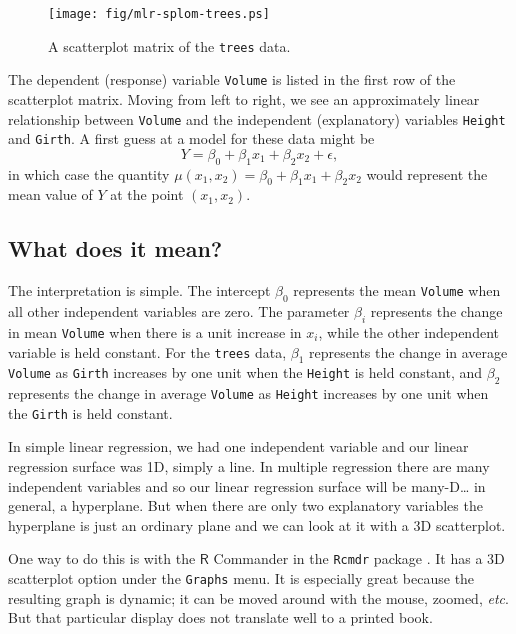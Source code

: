 \begin{figure}[ht!]
\centering
\texttt{[image: fig/mlr-splom-trees.ps]}
\caption[Scatterplot matrix of \texttt{trees} data]{\label{fig-splom-trees}\small A scatterplot matrix of the \texttt{trees} data.}
\end{figure}

The dependent (response) variable \texttt{Volume} is listed in the first row
of the scatterplot matrix. Moving from left to right, we see an
approximately linear relationship between \texttt{Volume} and the independent
(explanatory) variables \texttt{Height} and \texttt{Girth}. A first guess at a model
for these data might be
\begin{equation}
Y=\beta_{0}+\beta_{1}x_{1}+\beta_{2}x_{2}+\epsilon,
\end{equation}
in which case the quantity
\(\mu(x_{1},x_{2})=\beta_{0}+\beta_{1}x_{1}+\beta_{2}x_{2}\) would
represent the mean value of \(Y\) at the point \((x_{1},x_{2})\).

\subsection{What does it mean?}
\label{sec-12-1-1}

The interpretation is simple. The intercept \(\beta_{0}\) represents
the mean \texttt{Volume} when all other independent variables are zero. The
parameter \(\beta_{i}\) represents the change in mean \texttt{Volume} when
there is a unit increase in \(x_{i}\), while the other independent
variable is held constant. For the \texttt{trees} data, \(\beta_{1}\)
represents the change in average \texttt{Volume} as \texttt{Girth} increases by one
unit when the \texttt{Height} is held constant, and \(\beta_{2}\) represents
the change in average \texttt{Volume} as \texttt{Height} increases by one unit when
the \texttt{Girth} is held constant.


In simple linear regression, we had one independent variable and our
linear regression surface was 1D, simply a line. In multiple
regression there are many independent variables and so our linear
regression surface will be many-D\ldots{} in general, a hyperplane. But
when there are only two explanatory variables the hyperplane is just
an ordinary plane and we can look at it with a 3D scatterplot.

One way to do this is with the \(\mathsf{R}\) Commander in the \texttt{Rcmdr}
package \cite{Rcmdr}. It has a 3D scatterplot option under the
\texttt{Graphs} menu. It is especially great because the resulting graph is
dynamic; it can be moved around with the mouse, zoomed, \emph{etc}. But
that particular display does not translate well to a printed book.

